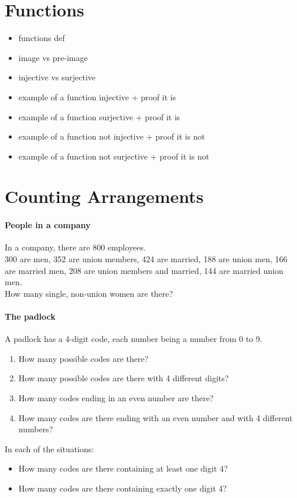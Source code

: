 \documentclass[a4paper,12pt]{article}
\providecommand{\tightlist}{\setlength{\itemsep}{0pt}\setlength{\parskip}{0pt}}
\begin{document}
	
	
	
	
	
	\section{Functions}
	
	\begin{itemize}
	\tightlist
	\item functions def
	\item image vs pre-image
	\item injective vs surjective
	\item example of a function injective + proof it is
	\item example of a function surjective + proof it is
	\item example of a function not injective + proof it is not
	\item example of a function not surjective + proof it is not
	\end{itemize}
	
	
	
	
	
	\section{Counting Arrangements}
	\paragraph{People in a company}
	In a company, there are 800 employees.\\
	300 are men, 352 are union members, 424 are married, 188 are union men, 166 are married men, 208 are union members and married, 144 are married union men.\\
	How many single, non-union women are there?
	
	\paragraph{The padlock}
	A padlock has a 4-digit code, each number being a number from 0 to 9.
	\begin{enumerate}
		\item How many possible codes are there?
		\item How many possible codes are there with 4 different digits?
		\item How many codes ending in an even number are there?
		\item How many codes are there ending with an even number and with 4 different numbers?
	\end{enumerate}
	In each of the situations:
	\begin{itemize}
		\item How many codes are there containing at least one digit 4?
		\item How many codes are there containing exactly one digit 4?
	\end{itemize}
	
\end{document}
